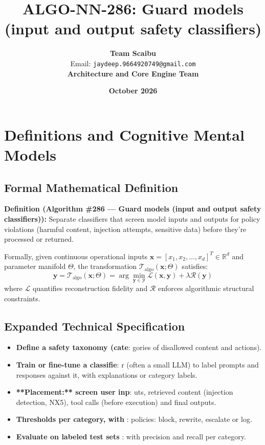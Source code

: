 \documentclass[11pt,a4paper]{article}
\title{\textbf{ALGO-NN-286: Guard models (input and output safety classifiers)}}
\author{\textbf{Team Scaibu} \\ \small Email: \texttt{jaydeep.9664920749@gmail.com} \\ \small \textbf{Architecture and Core Engine Team}}
\date{\textbf{October 2026}}
\theoremstyle{definition}
\begin{document}
\maketitle

\section{Definitions and Cognitive Mental Models}

\subsection{Formal Mathematical Definition}
\textbf{Definition (Algorithm \#286 --- Guard models (input and output safety classifiers)):}
Separate classifiers that screen model inputs and outputs for policy violations (harmful content, injection attempts, sensitive data) before they're processed or returned.

Formally, given continuous operational inputs $\mathbf{x} = [x_1, x_2, \dots, x_d]^T \in \mathbb{R}^d$ and parameter manifold $\Theta$, the transformation $\mathcal{T}_{\text{algo}}(\mathbf{x}; \Theta)$ satisfies:
{\boldmath
\begin{equation}
\mathbf{y} = \mathcal{T}_{\text{algo}}(\mathbf{x}; \Theta) = \arg\min_{\mathbf{y} \in \mathcal{Y}} \mathcal{L}(\mathbf{x}, \mathbf{y}) + \lambda \mathcal{R}(\mathbf{y})
\end{equation}
}
where $\mathcal{L}$ quantifies reconstruction fidelity and $\mathcal{R}$ enforces algorithmic structural constraints.

\subsection{Expanded Technical Specification}
\begin{itemize}
\item \textbf{Define a safety taxonomy (cate}: gories of disallowed content and actions).
\item \textbf{Train or fine-tune a classifie}: r (often a small LLM) to label prompts and responses against it, with explanations or category labels.
\item \textbf{**Placement:** screen user inp}: uts, retrieved content (injection detection, NX5), tool calls (before execution) and final outputs.
\item \textbf{Thresholds per category, with }: policies: block, rewrite, escalate or log.
\item \textbf{Evaluate on labeled test sets }: with precision and recall per category.
\end{itemize}
\end{document}
